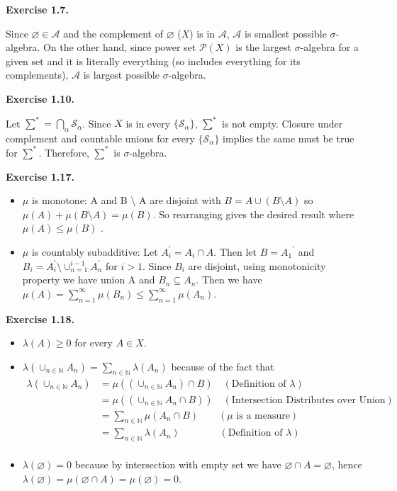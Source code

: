 \documentclass[12pt]{article}
\renewcommand{\emptyset}{\varnothing}
\begin{document}
\textbf{Exercise 1.7.}

Since $\emptyset \in \mathcal{A}$ and the complement of $\emptyset$ ($X$) is in $\mathcal{A}$, $\mathcal{A}$ is smallest possible $\sigma$-algebra. On the other hand, since power set $\mathcal{P}(X)$ is the largest $\sigma$-algebra for a given set and it is literally everything (so includes everything for its complements), $\mathcal{A}$ is largest possible $\sigma$-algebra.

\textbf{Exercise 1.10.}

Let $\sum^{*} = \bigcap_\alpha \mathcal{S}_\alpha$. Since $X$ is in every $\{\mathcal{S}_\alpha\}$, $\sum^{*}$ is not empty. Closure under complement and countable unions for every  $\{\mathcal{S}_\alpha\}$ implies the same must be true for $\sum^{*}$.  Therefore,  $\sum^{*}$ is $\sigma$-algebra.

\textbf{Exercise 1.17.}

\begin{itemize}
\item $\mu$ is monotone: A and B $\setminus$ A are disjoint with $B = A \cup (B \setminus A)$ so $\mu(A) + \mu (B \setminus A) = \mu(B)$. So rearranging gives the desired result where $\mu(A) \leq \mu(B)$  .

\item  $\mu$ is countably subadditive: Let $A_{i}^{'} = A_{i} \cap A$. Then let $B = {A_{1}}^{'}$ and $B_{i} = A_{i}^{'} \setminus \cup_{n=1}^{i-1} A_{n}^{'}$ for $i>1$. Since $B_{i}$ are disjoint, using monotonicity property we have union A and $B_{n} \subseteq A_{n}$. Then we have $\mu(A) = \sum_{n=1}^{\infty} \mu({B_{n}}) \leq  \sum_{n=1}^{\infty} \mu({A_{n}})$.

\end{itemize}

\textbf{Exercise 1.18.}
\begin{itemize}
\item $\lambda(A) \geq 0$ for every $A \in X$.
\item $\lambda(\cup_{n \in \mathbb{N}} A_{n}) = \sum_{n \in \mathbb{N}} \lambda(A_{n})$ because of the fact that 
\begin{align*}
\lambda(\cup_{n \in \mathbb{N}} A_{n}) & = \mu((\cup_{n \in \mathbb{N}} A_{n}) \cap B) \quad (\text{Definition of $\lambda$})\\ & = \mu((\cup_{n \in \mathbb{N}} A_{n} \cap B)) \quad (\text{Intersection Distributes over Union})\\ & = \sum_{n \in \mathbb{N}} \mu(A_{n} \cap B)  \quad \quad (\text{$\mu$ is a measure}) \\ & = \sum_{n \in \mathbb{N}} \lambda(A_{n}) \quad \quad \quad \quad (\text{Definition of $\lambda$})\\
\end{align*}
\item  $\lambda(\emptyset) = 0$ because by intersection with empty set we have $\emptyset \cap A = \emptyset$, hence $\lambda(\emptyset) = \mu(\emptyset \cap A) =  \mu(\emptyset) = 0$.

\end{itemize}
\end{document}
